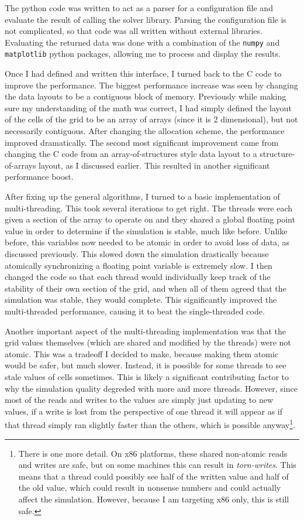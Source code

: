 The python code was written to act as a parser for a configuration file and evaluate the result of calling the solver library.
Parsing the configuration file is not complicated, so that code was all written without external libraries. Evaluating the
returned data was done with a combination of the \texttt{numpy} and \texttt{matplotlib} python packages, allowing me to process
and display the results.

Once I had defined and written this interface, I turned back to the C code to improve the performance. The biggest performance increase
was seen by changing the data layouts to be a contiguous block of memory. Previously while making sure my understanding of the math was
correct, I had simply defined the layout of the cells of the grid to be an array of arrays (since it is 2 dimensional), but not necessarily
contiguous. After changing the allocation scheme, the performance improved dramatically. The second most significant improvement came from
changing the C code from an array-of-structures style data layout to a structure-of-arrays layout, as I discussed earlier. This resulted in
another significant performance boost.

After fixing up the general algorithms, I turned to a basic implementation of multi-threading. This took several iterations to get right. The threads
were each given a section of the array to operate on and they shared a global floating point value in order to determine if the simulation is stable, much like before.
Unlike before, this variables now needed to be atomic in order to avoid loss of data, as discussed previously. This slowed down the simulation
drastically because atomically synchronizing a floating point variable is extremely slow. I then changed the code so that each thread would individually keep
track of the stability of their own section of the grid, and when all of them agreed that the simulation was stable, they would complete. This significantly improved
the multi-threaded performance, causing it to beat the single-threaded code.

Another important aspect of the multi-threading implementation was that the grid values themselves (which are shared and modified by the threads)
were not atomic. This was a tradeoff I decided to make, because making them atomic would be safer, but much slower. Instead, it is possible for
some threads to see stale values of cells sometimes. This is likely a significant contributing factor to why the simulation quality degreded with
more and more threads. However, since most of the reads and writes to the values are simply just updating to new values, if a write is lost from
the perspective of one thread it will appear as if that thread simply ran slightly faster than the others, which is possible anyway\footnote{There
is one more detail. On x86 platforms, these shared non-atomic reads and writes are safe, but on some machines this can result in \textit{torn-writes}.
This means that a thread could possibly see half of the written value and half of the old value, which could result in nonsense numbers and could
actually affect the simulation. However, because I am targeting x86 only, this is still safe.}.

